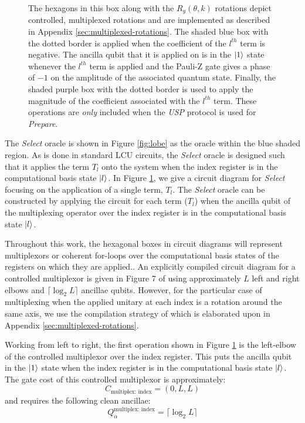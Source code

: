\begin{figure}
{        The hexagons in this box along with the $R_y(\theta, k)$ rotations depict controlled, multiplexed rotations and are implemented as described in Appendix \ref{sec:multiplexed-rotations}.
        The shaded blue box with the dotted border is applied when the coefficient of the $l^{th}$ term is negative.
        The ancilla qubit that it is applied on is in the $\ket{1}$ state whenever the $l^{th}$ term is applied and the Pauli-Z gate gives a phase of $-1$ on the amplitude of the associated quantum state.
        Finally, the shaded purple box with the dotted border is used to apply the magnitude of the coefficient associated with the $l^{th}$ term.
        These operations are \textit{only} included when the \textit{USP} protocol is used for \textit{Prepare}.
    }
    \label{fig:select}
\end{figure}

The \textit{Select} oracle is shown in Figure \ref{fig:lobe} as the oracle within the blue shaded region.
As is done in standard LCU circuits, the \textit{Select} oracle is designed such that it applies the term $T_l$ onto the system when the index register is in the computational basis state $\ket{l}$.
In Figure \ref{fig:select}, we give a circuit diagram for \textit{Select} focusing on the application of a single term, $T_l$.
The \textit{Select} oracle can be constructed by applying the circuit for each term ($T_l$) when the ancilla qubit of the multiplexing operator over the index register is in the computational basis state $\ket{l}$.

Throughout this work, the hexagonal boxes in circuit diagrams will represent multiplexors or coherent for-loops over the computational basis states of the registers on which they are applied..
An explicitly compiled circuit diagram for a controlled multiplexor is given in Figure 7 of \cite{babbush2018encoding} using approximately $L$ left and right elbows and $\lceil \log_2{L} \rceil$ ancillae qubits.
However, for the particular case of multiplexing when the applied unitary at each index is a rotation around the same axis, we use the compilation strategy of \cite{mottonen2004transformation} which is elaborated upon in Appendix \ref{sec:multiplexed-rotations}.

Working from left to right, the first operation shown in Figure \ref{fig:select} is the left-elbow of the controlled multiplexor over the index register.
This puts the ancilla qubit in the $\ket{1}$ state when the index register is in the computational basis state $\ket{l}$.
The gate cost of this controlled multiplexor is approximately:
\begin{equation}
    C_{\text{multiplex: index}} = (0, L, L)
\end{equation}
and requires the following clean ancillae:
\begin{equation}
    Q_{\alpha}^{\text{multiplex: index}} = \lceil \log_2{L} \rceil
\end{equation}

